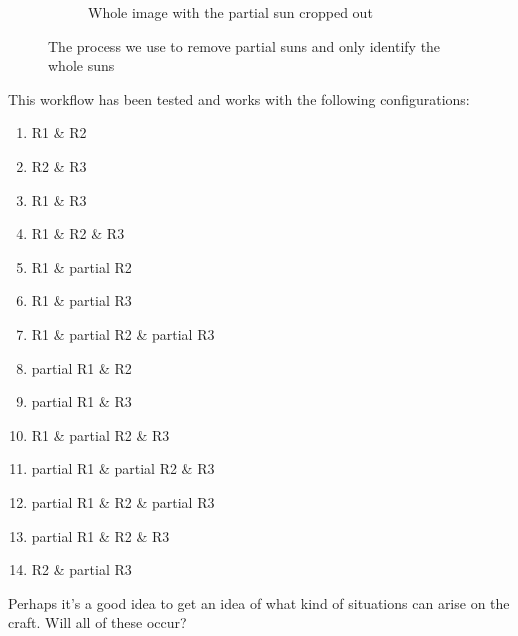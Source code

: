 \documentclass[10pt]{scrartcl}
\begin{document}
\begin{figure}[!ht]
\begin{subfigure}{.49\textwidth}
        \caption{Whole image with the partial sun cropped out}
        \label{fixed_image}
    \end{subfigure}
    \caption{The process we use to remove partial suns and only identify the whole suns}
    \label{fixtheregion}
\end{figure}

This workflow has been tested and works with the following configurations:
\begin{enumerate}
    \item R1 \& R2
    \item R2 \& R3
    \item R1 \& R3
    \item R1 \& R2 \& R3
    \item R1 \& partial R2
    \item R1 \& partial R3
    \item R1 \& partial R2 \& partial R3
    \item partial R1 \& R2
    \item partial R1 \& R3
    \item R1 \& partial R2 \& R3
    \item partial R1 \& partial R2 \& R3
    \item partial R1 \& R2 \& partial R3
    \item partial R1 \& R2 \& R3
    \item R2 \& partial R3
\end{enumerate}



Perhaps it's a good idea to get an idea of what kind of situations can arise on the craft. Will all of these occur?


\end{document}
